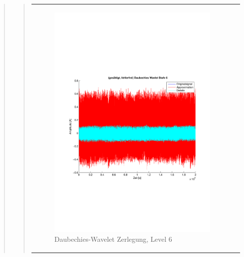 \begin{quote}
\begin{quote}
\begin{center}
\begin{tabular}{ll}
\begin{minipage}{0.6\textwidth}
                    \end{minipage}
                    \begin{minipage}{0.6\textwidth}
    
                        \begin{figure}[H]
                            \label{fig:}
                            \includegraphics[scale=0.4, trim = 2cm 6cm 1cm
                            7.5cm,
                            clip]{./Bilder/Termin8/fehlerfrei_gesaettigt_Daubechies_Wavlet_lvl_6}
                            \caption{Daubechies-Wavelet Zerlegung, Level 6}
                        \end{figure}
                    \vspace{-1.5em}
    
                    \end{minipage}
    

\end{tabular}
\end{center}
\end{quote}
\end{quote}
